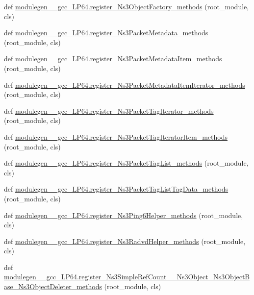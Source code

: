 \begin{DoxyCompactItemize}
\item 
def \hyperlink{namespacemodulegen____gcc__LP64_a786202f6865813272a2645524e567a31}{modulegen\+\_\+\+\_\+gcc\+\_\+\+L\+P64.\+register\+\_\+\+Ns3\+Object\+Factory\+\_\+methods} (root\+\_\+module, cls)
\item 
def \hyperlink{namespacemodulegen____gcc__LP64_a1389373aaae60b11eca14fb1daaa350f}{modulegen\+\_\+\+\_\+gcc\+\_\+\+L\+P64.\+register\+\_\+\+Ns3\+Packet\+Metadata\+\_\+methods} (root\+\_\+module, cls)
\item 
def \hyperlink{namespacemodulegen____gcc__LP64_a2ac7c9819f0a71366e0cb996f16c2232}{modulegen\+\_\+\+\_\+gcc\+\_\+\+L\+P64.\+register\+\_\+\+Ns3\+Packet\+Metadata\+Item\+\_\+methods} (root\+\_\+module, cls)
\item 
def \hyperlink{namespacemodulegen____gcc__LP64_ad75a5ba1c89bf75f399491ebc4bc2299}{modulegen\+\_\+\+\_\+gcc\+\_\+\+L\+P64.\+register\+\_\+\+Ns3\+Packet\+Metadata\+Item\+Iterator\+\_\+methods} (root\+\_\+module, cls)
\item 
def \hyperlink{namespacemodulegen____gcc__LP64_a1d07a5663a331363a6765890f7c3f7ad}{modulegen\+\_\+\+\_\+gcc\+\_\+\+L\+P64.\+register\+\_\+\+Ns3\+Packet\+Tag\+Iterator\+\_\+methods} (root\+\_\+module, cls)
\item 
def \hyperlink{namespacemodulegen____gcc__LP64_af0346c019adfcbf415a97ec6cff465e1}{modulegen\+\_\+\+\_\+gcc\+\_\+\+L\+P64.\+register\+\_\+\+Ns3\+Packet\+Tag\+Iterator\+Item\+\_\+methods} (root\+\_\+module, cls)
\item 
def \hyperlink{namespacemodulegen____gcc__LP64_a96f93e9ac4cca72d9c82bad3ed221800}{modulegen\+\_\+\+\_\+gcc\+\_\+\+L\+P64.\+register\+\_\+\+Ns3\+Packet\+Tag\+List\+\_\+methods} (root\+\_\+module, cls)
\item 
def \hyperlink{namespacemodulegen____gcc__LP64_a5297a25e4d02fb34208dfd16709b500f}{modulegen\+\_\+\+\_\+gcc\+\_\+\+L\+P64.\+register\+\_\+\+Ns3\+Packet\+Tag\+List\+Tag\+Data\+\_\+methods} (root\+\_\+module, cls)
\item 
def \hyperlink{namespacemodulegen____gcc__LP64_a7afb9d30598b5eecae1c2f7c8a06eea8}{modulegen\+\_\+\+\_\+gcc\+\_\+\+L\+P64.\+register\+\_\+\+Ns3\+Ping6\+Helper\+\_\+methods} (root\+\_\+module, cls)
\item 
def \hyperlink{namespacemodulegen____gcc__LP64_a8042438f3b41a00889ce45541cd2ab08}{modulegen\+\_\+\+\_\+gcc\+\_\+\+L\+P64.\+register\+\_\+\+Ns3\+Radvd\+Helper\+\_\+methods} (root\+\_\+module, cls)
\item 
def \hyperlink{namespacemodulegen____gcc__LP64_a3df0bc75eda374a47e4888b021d60870}{modulegen\+\_\+\+\_\+gcc\+\_\+\+L\+P64.\+register\+\_\+\+Ns3\+Simple\+Ref\+Count\+\_\+\+\_\+\+Ns3\+Object\+\_\+\+Ns3\+Object\+Base\+\_\+\+Ns3\+Object\+Deleter\+\_\+methods} (root\+\_\+module, cls)

\end{DoxyCompactItemize}
